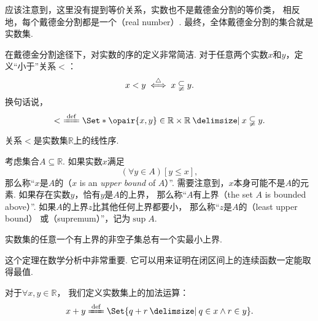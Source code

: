 应该注意到，这里没有提到等价关系，实数也不是戴德金分割的等价类，
相反地，每个戴德金分割都是一个（real number）.
最终，全体戴德金分割的集合就是实数集.

在戴德金分割途径下，对实数的序的定义非常简洁.
对于任意两个实数\(x\)和\(y\)，定义“小于”关系\(<\)：\[
	x < y \overset{\triangle}{\iff} x \subsetneqq y.
\]
换句话说，\[
	<\ \defeq \Set*{ \opair{x,y}\in\mathbb{R}\times\mathbb{R} \given x \subsetneqq y }.
\]

\begin{theorem}
关系\(<\)是实数集\(\mathbb{R}\)上的线性序.
\end{theorem}

考虑集合\(A \subseteq \mathbb{R}\).
如果实数\(x\)满足\[
	(\forall y \in A)[y \leqslant x],
\]
那么称“\(x\)是\(A\)的（\(x\) is an \emph{upper bound} of \(A\)）”.
需要注意到，\(x\)本身可能不是\(A\)的元素.
如果存在实数\(y\)，恰有\(y\)是\(A\)的上界，
那么称“\(A\)有上界（the set \(A\) is bounded above）”.
如果\(A\)的上界\(z\)比其他任何上界都要小，
那么称“\(z\)是\(A\)的（least upper bound）%
或（supremum）”，记为\(\sup A\).

%
%
%

\begin{theorem}
实数集的任意一个有上界的非空子集总有一个实最小上界.
\end{theorem}
这个定理在数学分析中非常重要.
它可以用来证明在闭区间上的连续函数一定能取得最值.

\begin{definition}
对于\(\forall x,y\in\mathbb{R}\)，
我们定义实数集上的加法运算：
\begin{equation}
	x + y \defeq \Set{
		q + r \given q \in x \land r \in y
	}.
\end{equation}
\end{definition}

